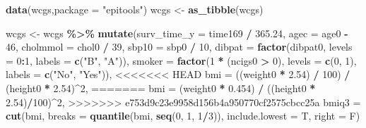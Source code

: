 \documentclass[
]{book}
\newenvironment{Shaded}{\begin{snugshade}}{\end{snugshade}}
\newcommand{\DataTypeTok}[1]{\textcolor[rgb]{0.13,0.29,0.53}{#1}}
\newcommand{\DecValTok}[1]{\textcolor[rgb]{0.00,0.00,0.81}{#1}}
\newcommand{\FloatTok}[1]{\textcolor[rgb]{0.00,0.00,0.81}{#1}}
\newcommand{\KeywordTok}[1]{\textcolor[rgb]{0.13,0.29,0.53}{\textbf{#1}}}
\newcommand{\NormalTok}[1]{#1}
\newcommand{\OperatorTok}[1]{\textcolor[rgb]{0.81,0.36,0.00}{\textbf{#1}}}
\newcommand{\StringTok}[1]{\textcolor[rgb]{0.31,0.60,0.02}{#1}}
\begin{document}
\begin{Shaded}
\begin{Highlighting}[]
\KeywordTok{data}\NormalTok{(wcgs,}\DataTypeTok{package =} \StringTok{"epitools"}\NormalTok{)}
\NormalTok{wcgs <{-}}\StringTok{ }\KeywordTok{as\_tibble}\NormalTok{(wcgs)}

\NormalTok{wcgs <{-}}\StringTok{ }\NormalTok{wcgs }\OperatorTok{\%>\%}\StringTok{ }
\StringTok{  }\KeywordTok{mutate}\NormalTok{(}\DataTypeTok{surv\_time\_y =}\NormalTok{ time169 }\OperatorTok{/}\StringTok{ }\FloatTok{365.24}\NormalTok{,}
         \DataTypeTok{agec =}\NormalTok{ age0 }\OperatorTok{{-}}\StringTok{ }\DecValTok{46}\NormalTok{,}
         \DataTypeTok{cholmmol =}\NormalTok{ chol0 }\OperatorTok{/}\StringTok{ }\DecValTok{39}\NormalTok{,}
         \DataTypeTok{sbp10 =}\NormalTok{ sbp0 }\OperatorTok{/}\StringTok{ }\DecValTok{10}\NormalTok{,}
         \DataTypeTok{dibpat =} \KeywordTok{factor}\NormalTok{(dibpat0, }\DataTypeTok{levels =} \DecValTok{0}\OperatorTok{:}\DecValTok{1}\NormalTok{, }\DataTypeTok{labels =} \KeywordTok{c}\NormalTok{(}\StringTok{"B"}\NormalTok{, }\StringTok{"A"}\NormalTok{)),}
         \DataTypeTok{smoker =} \KeywordTok{factor}\NormalTok{(}\DecValTok{1} \OperatorTok{*}\StringTok{ }\NormalTok{(ncigs0 }\OperatorTok{>}\StringTok{ }\DecValTok{0}\NormalTok{), }\DataTypeTok{levels =} \KeywordTok{c}\NormalTok{(}\DecValTok{0}\NormalTok{, }\DecValTok{1}\NormalTok{), }\DataTypeTok{labels =} \KeywordTok{c}\NormalTok{(}\StringTok{"No"}\NormalTok{, }\StringTok{"Yes"}\NormalTok{)),}
<<<<<<< HEAD
         \DataTypeTok{bmi =}\NormalTok{ ((weight0 }\OperatorTok{*}\StringTok{ }\FloatTok{2.54}\NormalTok{) }\OperatorTok{/}\StringTok{ }\DecValTok{100}\NormalTok{) }\OperatorTok{/}\StringTok{ }\NormalTok{(height0 }\OperatorTok{*}\StringTok{ }\FloatTok{2.54}\NormalTok{)}\OperatorTok{\^{}}\DecValTok{2}\NormalTok{,}
=======
         \DataTypeTok{bmi =}\NormalTok{ (weight0 }\OperatorTok{*}\StringTok{ }\FloatTok{0.454}\NormalTok{) }\OperatorTok{/}\StringTok{ }\NormalTok{((height0 }\OperatorTok{*}\StringTok{ }\FloatTok{2.54}\NormalTok{)}\OperatorTok{/}\DecValTok{100}\NormalTok{)}\OperatorTok{^}\DecValTok{2}\NormalTok{,}
>>>>>>> e753d9c23e9958d156b4a950770cf2575cbcc25a
         \DataTypeTok{bmiq3 =} \KeywordTok{cut}\NormalTok{(bmi, }\DataTypeTok{breaks =} \KeywordTok{quantile}\NormalTok{(bmi, }\KeywordTok{seq}\NormalTok{(}\DecValTok{0}\NormalTok{, }\DecValTok{1}\NormalTok{, }\DecValTok{1}\OperatorTok{/}\DecValTok{3}\NormalTok{)),}
                       \DataTypeTok{include.lowest =}\NormalTok{ T, }\DataTypeTok{right =}\NormalTok{ F)}

\end{Highlighting}
\end{Shaded}
\end{document}
